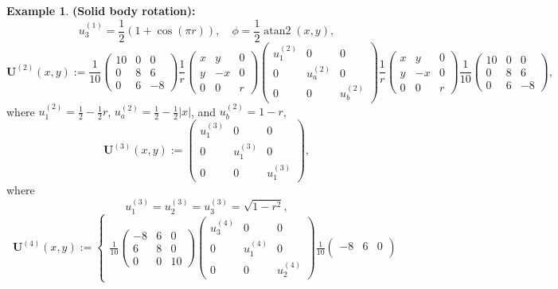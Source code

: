 \documentclass[final,12pt]{amsart}
\theoremstyle{plain}
\theoremstyle{definition}
\newtheorem{example}{Example}
\begin{document}
\begin{example}{\bf (Solid body rotation):}
\[u_3^{(1)} = \frac{1}{2} (1+\cos(\pi r)), \quad
\phi = \frac{1}{2} \operatorname{atan2}(x,y),
\]
\[
\mathbf{U}^{(2)}(x,y) := \frac{1}{10}
\begin{pmatrix}
	10 & 0 & 0 \\
	0 & 8 & 6 \\
	0 & 6 & -8
\end{pmatrix}
\frac{1}{r}
\begin{pmatrix}
	x & y & 0 \\
	y & -x & 0 \\
	0 & 0 & r
\end{pmatrix}
\begin{pmatrix}
	u_1^{(2)} & 0 & 0 \\
	0 & u_a^{(2)} & 0 \\
	0 & 0 & u_b^{(2)}
\end{pmatrix}
\frac{1}{r}
\begin{pmatrix}
	x & y & 0 \\
	y & -x & 0 \\
	0 & 0 & r
\end{pmatrix}
\frac{1}{10}
\begin{pmatrix}
	10 & 0 & 0 \\
	0 & 8 & 6 \\
	0 & 6 & -8
\end{pmatrix},
\]
where $u^{(2)}_1 =\frac{1}{2}- \frac{1}{2} r$, $u^{(2)}_a = \frac{1}{2} - \frac{1}{2} |x|$, and $u^{(2)}_b = 1 - r$,
\begin{equation}
	\mathbf{U}^{(3)}(x,y) := \begin{pmatrix} u^{(3)}_1 & 0 & 0 \\ 0 & u^{(3)}_1 & 0 \\ 0 & 0 & u^{(3)}_1 \end{pmatrix},
\end{equation}
where
\[
u_1^{(3)} = u_2^{(3)} = u_3^{(3)} = \sqrt{1 - r^2},
\]
\[
\mathbf{U}^{(4)}(x,y) :=
\begin{cases}
	\frac{1}{10}
	\begin{pmatrix}
		-8 & 6 & 0 \\
		6 & 8 & 0 \\
		0 & 0 & 10
	\end{pmatrix}
	\begin{pmatrix}
		u_3^{(4)} & 0 & 0 \\
		0 & u_1^{(4)} & 0 \\
		0 & 0 & u_2^{(4)}
	\end{pmatrix}
	\frac{1}{10}
	\begin{pmatrix}
		-8 & 6 & 0 \\

\end{pmatrix}
\end{cases}\]
\end{example}
\end{document}
